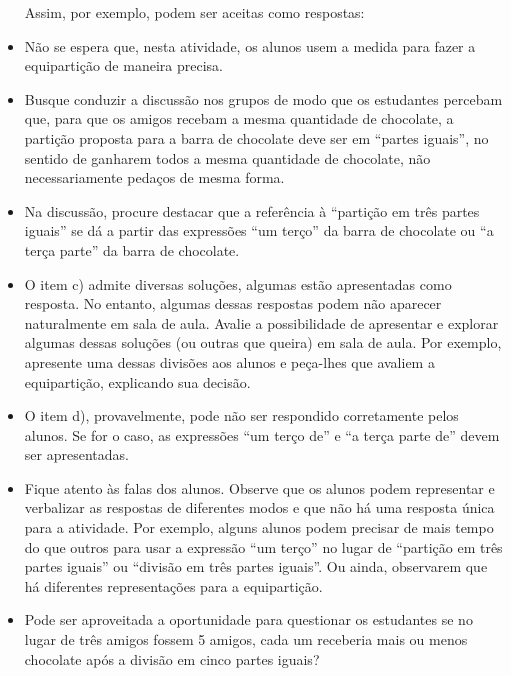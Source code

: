 \begin{atividade}
\begin{itemize}
  Assim, por exemplo, podem ser aceitas como respostas:
    \begin{center}
    \end{center}
  \item  Não se espera que, nesta atividade, os alunos usem a medida para fazer a equipartição de maneira precisa.
    \item Busque conduzir a discussão nos grupos de modo que os estudantes percebam que, para que os amigos recebam a mesma quantidade de chocolate, a partição proposta para a barra de chocolate deve ser em ``partes iguais'', no sentido de ganharem todos a mesma quantidade de chocolate, não necessariamente pedaços de mesma forma.
    \item Na discussão, procure destacar que a referência à ``partição em três partes iguais'' se dá a partir das expressões ``um terço'' da barra de chocolate ou ``a terça parte'' da barra de chocolate.
    \item O item c) admite diversas soluções, algumas estão apresentadas como resposta. No entanto, algumas dessas respostas podem não aparecer naturalmente em sala de aula. Avalie a possibilidade de apresentar e explorar algumas dessas soluções (ou outras que queira) em sala de aula. Por exemplo, apresente uma dessas divisões aos alunos e peça-lhes que avaliem a equipartição, explicando sua decisão.
    \item O item d), provavelmente, pode não ser respondido corretamente pelos alunos. Se for o caso, as expressões ``um terço de'' e ``a terça parte de'' devem ser apresentadas.
    \item Fique atento às falas dos alunos. Observe que os alunos podem representar e verbalizar as respostas de diferentes modos e que não há uma resposta única para a atividade. Por exemplo, alguns alunos podem precisar de mais tempo do que outros para usar a expressão       ``um terço'' no lugar de       ``partição em três partes iguais'' ou ``divisão em três partes iguais''. Ou ainda, observarem que há diferentes representações para a equipartição.
      \item Pode ser aproveitada a oportunidade para questionar os estudantes se no lugar de três amigos fossem 5 amigos, cada um receberia mais ou menos chocolate após a divisão em cinco partes iguais? 
\end{itemize} %



\end{atividade}
